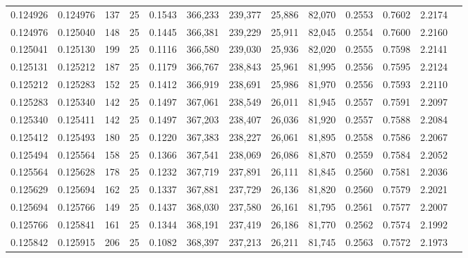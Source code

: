 \begin{tabular}{rrrrrrrrrrrrr}
0.124926 & 0.124976 &   137 &  25 &                                     0.1543 & 366,233 & 239,377 &  25,886 &  82,070 & 0.2553 & 0.7602 & 2.2174 \\
0.124976 & 0.125040 &   148 &  25 &                                     0.1445 & 366,381 & 239,229 &  25,911 &  82,045 & 0.2554 & 0.7600 & 2.2160 \\
0.125041 & 0.125130 &   199 &  25 &                                     0.1116 & 366,580 & 239,030 &  25,936 &  82,020 & 0.2555 & 0.7598 & 2.2141 \\
0.125131 & 0.125212 &   187 &  25 &                                     0.1179 & 366,767 & 238,843 &  25,961 &  81,995 & 0.2556 & 0.7595 & 2.2124 \\
0.125212 & 0.125283 &   152 &  25 &                                     0.1412 & 366,919 & 238,691 &  25,986 &  81,970 & 0.2556 & 0.7593 & 2.2110 \\
0.125283 & 0.125340 &   142 &  25 &                                     0.1497 & 367,061 & 238,549 &  26,011 &  81,945 & 0.2557 & 0.7591 & 2.2097 \\
0.125340 & 0.125411 &   142 &  25 &                                     0.1497 & 367,203 & 238,407 &  26,036 &  81,920 & 0.2557 & 0.7588 & 2.2084 \\
0.125412 & 0.125493 &   180 &  25 &                                     0.1220 & 367,383 & 238,227 &  26,061 &  81,895 & 0.2558 & 0.7586 & 2.2067 \\
0.125494 & 0.125564 &   158 &  25 &                                     0.1366 & 367,541 & 238,069 &  26,086 &  81,870 & 0.2559 & 0.7584 & 2.2052 \\
0.125564 & 0.125628 &   178 &  25 &                                     0.1232 & 367,719 & 237,891 &  26,111 &  81,845 & 0.2560 & 0.7581 & 2.2036 \\
0.125629 & 0.125694 &   162 &  25 &                                     0.1337 & 367,881 & 237,729 &  26,136 &  81,820 & 0.2560 & 0.7579 & 2.2021 \\
0.125694 & 0.125766 &   149 &  25 &                                     0.1437 & 368,030 & 237,580 &  26,161 &  81,795 & 0.2561 & 0.7577 & 2.2007 \\
0.125766 & 0.125841 &   161 &  25 &                                     0.1344 & 368,191 & 237,419 &  26,186 &  81,770 & 0.2562 & 0.7574 & 2.1992 \\
0.125842 & 0.125915 &   206 &  25 &                                     0.1082 & 368,397 & 237,213 &  26,211 &  81,745 & 0.2563 & 0.7572 & 2.1973 \\

\end{tabular}
